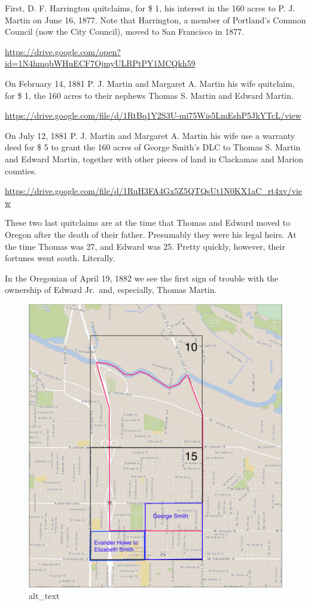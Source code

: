 \documentclass[
  12pt,
]{book}
\begin{document}
First, D. F. Harrington quitclaims, for \$ 1, his interest in the 160 acres to P. J. Martin on June 16, 1877. Note that Harrington, a member of Portland's Common Council (now the City Council), moved to San Francisco in 1877.

\url{https://drive.google.com/open?id=1N4hmqbWHuECF7OjmyULRPtPY1MCQkh59}

On February 14, 1881 P. J. Martin and Margaret A. Martin his wife quitclaim, for \$ 1, the 160 acres to their nephews Thomas S. Martin and Edward Martin.

\url{https://drive.google.com/file/d/1RtBq1Y2S3U-mi75Wis5LmEshP5JkYTcL/view}

On July 12, 1881 P. J. Martin and Margaret A. Martin his wife use a warranty deed for \$ 5 to grant the 160 acres of George Smith's DLC to Thomas S. Martin and Edward Martin, together with other pieces of land in Clackamas and Marion counties.

\url{https://drive.google.com/file/d/1RuH3FA4Gx5Z5QTQsUt1N0KX1aC_rt4xv/view}

These two last quitclaims are at the time that Thomas and Edward moved to Oregon after the death of their father. Presumably they were his legal heirs. At the time Thomas was 27, and Edward was 25. Pretty quickly, however, their fortunes went south. Literally.

In the Oregonian of April 19, 1882 we see the first sign of trouble with the ownership of Edward Jr.~and, especially, Thomas Martin.

\begin{figure}
\centering
\includegraphics{images/0203a_images/image3.png}
\caption{alt\_text}
\end{figure}
\end{document}
